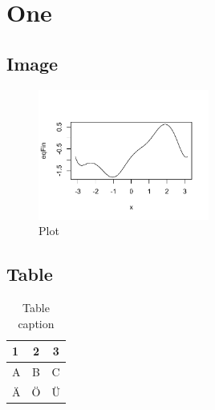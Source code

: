 \chapter{One}
\blindtext \autocite{demo0815}

\section{Image}
\begin{figure}[hbt]
	\centering
  \includegraphics[width=0.5\textwidth]{chapters/one/img/Rplot}
  \caption{Plot}
\end{figure}

\section{Table}
\begin{table}[hbt]
\centering
  \begin{tabular}{l|cc}
    1 & 2 & 3\\
    \hline
    A & B & C\\
    Ä & Ö & Ü
  \end{tabular}
  \caption{Table caption}
\end{table}
